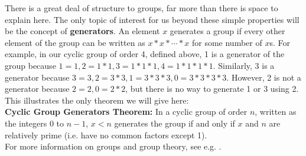 \documentclass[11pt]{article}
\begin{document}
There is a great deal of structure to groups, far more than there is space to explain here. The only topic of interest for us beyond these simple properties will be the concept of \textbf{generators}. An element $x$ generates a group if every other element of the group can be written as $x*x*\cdots*x$ for some number of $x$s. For example, in our cyclic group of order 4, defined above, 1 is a generator of the group because $1 = 1, 2 = 1 * 1, 3 = 1 * 1 * 1, 4 = 1 * 1 * 1 * 1$. Similarly, 3 is a generator because $3 = 3, 2 = 3 * 3, 1 = 3 * 3 * 3, 0 = 3 * 3 * 3 * 3$. However, 2 is not a generator because $2 = 2, 0 = 2 * 2$, but there is no way to generate 1 or 3 using 2. This illustrates the only theorem we will give here: \\[11pt]
\textbf{Cyclic Group Generators Theorem:} In a cyclic group of order $n$, written as the integers $0$ to $n-1$, $x < n$ generates the group if and only if $x$ and $n$ are relatively prime (i.e. have no common factors except 1). \\[11pt] 
For more information on groups and group theory, see e.g. \cite{Lang2002}.
 
\end{document}
